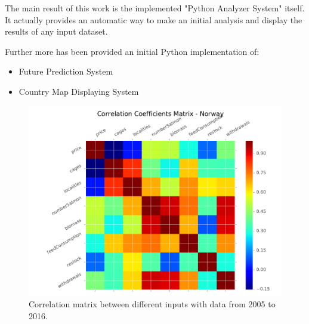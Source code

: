 

The main result of this work is the implemented "Python Analyzer System" itself. It actually provides an automatic way to make an initial analysis and display the results of any input dataset.

Further more has been provided an initial Python implementation of:
\begin{itemize}
\item Future Prediction System
\item Country Map Displaying System
\end{itemize}
\newpage

\begin{figure}[H]
	\centering
    \includegraphics[width=1\textwidth]{Files/Total_Dataset_Matrix.pdf}
    \caption{Correlation matrix between different inputs with data from 2005 to 2016.}
\end{figure}

